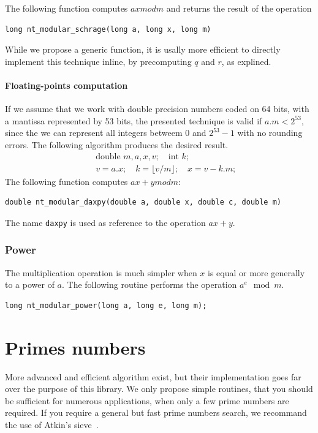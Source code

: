The following function computes $ax mod m$ and returns the result of
the operation
\begin{verbatim}
long nt_modular_schrage(long a, long x, long m)
\end{verbatim}
While we propose a generic function, it is usally more efficient to
directly implement this technique inline, by precomputing $q$ and $r$,
as explined.

\paragraph{Floating-points computation}

If we assume that we work with double precision numbers coded on 64
bits, with a mantissa represented by 53 bits, the presented technique
is valid if $a.m < 2^{53}$, since the we can represent all integers
betweem 0 and $2^{53}-1$ with no rounding errors.
The following algorithm produces the desired result.
\begin {eqnarray*}
   && \mbox{double } m, a, x, v; \quad  \mbox{int } k; \\
   && v = a.x; \quad
    k = \lfloor v / m \rfloor; \quad
    x = v - k.m;
\end {eqnarray*}
The following function computes $ax + y mod m$:
\begin{verbatim}
double nt_modular_daxpy(double a, double x, double c, double m)
\end{verbatim}
The name \verb|daxpy| is used as reference to the \blas{} operation $ax+y$.

\subsubsection{Power}

The multiplication operation is much simpler when $x$ is equal or more
generally to a power of $a$.
The following routine performs the operation $a^e \mod{} m$.
\begin{verbatim}
long nt_modular_power(long a, long e, long m);
\end{verbatim}
\section{Primes numbers}

More advanced and efficient algorithm exist, but their implementation
goes far over the purpose of this library.
We only propose simple routines, that you should be sufficient for
numerous applications, when only a few prime numbers are required.
If you require a general but fast prime numbers search, we recommand
the use of Atkin's sieve~\cite{AtkiBern04}.

